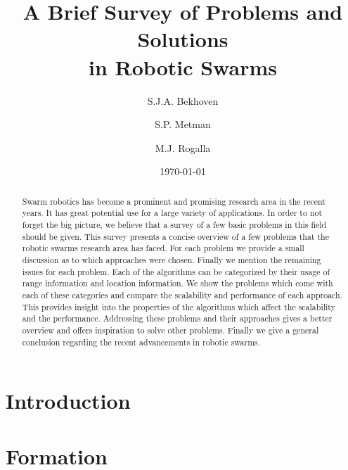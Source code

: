 \documentclass[a4paper]{article}
\title{A Brief Survey of Problems and Solutions \\ in Robotic Swarms}
\author{S.J.A. Bekhoven  \and
    S.P. Metman \and
    M.J. Rogalla}
\date{\today}
\begin{document}
\maketitle

\begin{abstract}
Swarm robotics has become a prominent and promising research area in the recent years. 
It has great potential use for a large variety of applications. 
In order to not forget the big picture, we believe that a survey of a few basic problems in this field should be given. 
This survey presents a concise overview of a few problems that the robotic swarms research area has faced. For each problem we provide a small discussion as to which approaches were chosen. 
Finally we mention the remaining issues for each problem. 
Each of the algorithms can be categorized by their usage of range information and location information. 
We show the problems which come with each of these categories and compare the scalability and performance of each approach. 
This provides insight into the properties of the algorithms which affect the scalability and the performance. 
Addressing these problems and their approaches gives a better overview and offers inspiration to solve other problems.
Finally we give a general conclusion regarding the recent advancements in robotic swarms.
\end{abstract}


\section{Introduction}
  

\section{Formation}
  \label{sec:Formation}
  
\end{document}

